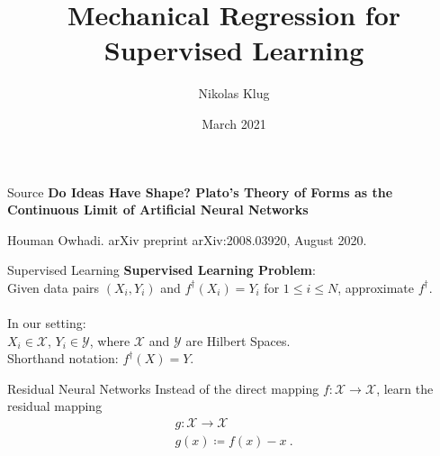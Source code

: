 \documentclass[8pt]{beamer}
\title[]{Mechanical Regression for Supervised Learning}
\author[Nikolas Klug]{Nikolas Klug}
\institute[University of Augsburg]{University of Augsburg}
\date{\nth{25} March 2021}
\newcommand{\cX}{\mathcal{X}}
\newcommand{\cY}{\mathcal{Y}}
\begin{document}
	{
	\begin{frame}
		\titlepage
	\end{frame}
	}
	\addtocounter{framenumber}{-1}

	\begin{frame}{Source}
		\textbf{Do Ideas Have Shape? Plato's Theory of Forms as the Continuous Limit of Artificial Neural Networks}\linebreak
		\begin{footnotesize}
			Houman Owhadi.\linebreak
			arXiv preprint arXiv:2008.03920, August 2020.
		\end{footnotesize}
	\end{frame}

	\begin{frame}{Supervised Learning}
		\textbf{Supervised Learning Problem}:\\
		Given data pairs $(X_i, Y_i)$ and $f^\dagger(X_i) = Y_i$ for $1 \leq i \leq N$,
		approximate $f^\dagger$.
		\\~\\
		In our setting:\\
		$X_i \in \cX$, $Y_i \in \cY$, where $\cX$ and $\cY$ are Hilbert Spaces.\\
		Shorthand notation: $f^\dagger(X) = Y$.
	\end{frame}

	\begin{frame}{Residual Neural Networks}
		Instead of the direct mapping $f: \cX \rightarrow \cX$, learn the residual mapping 
		\begin{gather*}
			g: \cX \rightarrow \cX\\
			g(x) \coloneqq f(x) - x \ .
		\end{gather*}
		
	\end{frame}
\end{document}
